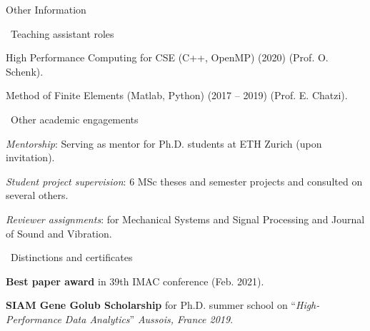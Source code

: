 \documentclass{resume} %
\begin{document}
\begin{rSection}{Other Information}
  \begin{rSubsection}{\,\,\,Teaching assistant roles}{}{}{} 
    \item High Performance Computing for CSE (C++, OpenMP) (2020) (Prof. O. Schenk).
    \item Method of Finite Elements (Matlab, Python) (2017 -- 2019) (Prof. E. Chatzi).
  \end{rSubsection}
   \begin{rSubsection}{\,\,\,Other academic engagements}{}{}{}
   \item \textit{Mentorship}: Serving as mentor for Ph.D. students at ETH Zurich (upon invitation).
   \item \textit{Student project supervision}: 6 MSc theses and semester projects and consulted on several others.
  \item \textit{Reviewer assignments}: for Mechanical Systems and Signal Processing and Journal of Sound and Vibration.
  \end{rSubsection}

  \begin{rSubsection}{\,\,\,Distinctions and certificates}{}{}{}
\item {\textbf{Best paper award}} in 39th IMAC conference (Feb. 2021).
  \item \textbf{SIAM Gene Golub Scholarship} for Ph.D. summer school on ``\textit{{High-Performance Data Analytics}}'' \textit{Aussois, France 2019}.
  \end{rSubsection}

\end{rSection}
\end{document}
